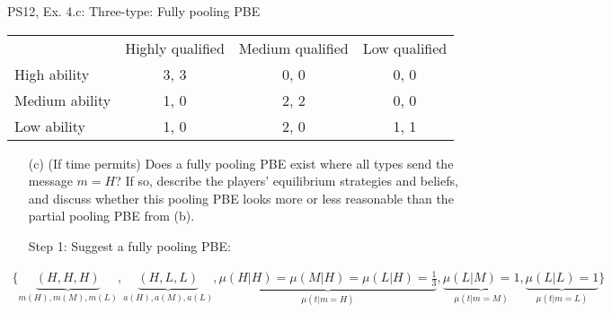 \begin{frame}{PS12, Ex. 4.c: Three-type: Fully pooling PBE}
    \begin{table}
      \begin{tabular}{l|c|c|c|}
          \multicolumn{1}{c}{} & \multicolumn{1}{c}{Highly qualified} & \multicolumn{1}{c}{Medium qualified} & \multicolumn{1}{c}{Low qualified} \\\cline{2-4}
          High ability   & 3, 3 & 0, 0 & 0, 0 \\\cline{2-4}
          Medium ability & 1, 0 & 2, 2 & 0, 0 \\\cline{2-4}
          Low ability    & 1, 0 & 2, 0 & 1, 1 \\\cline{2-4}
      \end{tabular}
    \end{table}\vspace{-8pt}
    \begin{itemize}
      \item[(c)] (If time permits) Does a fully pooling PBE exist where all types send the message $m = H$? If so, describe the players’ equilibrium strategies and beliefs, and discuss whether this pooling PBE looks more or less reasonable than the partial pooling PBE from (b).
      \item[Step 1:] Suggest a fully pooling PBE:
    \end{itemize}\vspace{-12pt}
    \begin{align*}
      \{\underbrace{(H,H,H)}_{m(H),m(M),m(L)},\underbrace{(H,L,L)}_{a(H),a(M),a(L)},\underbrace{\mu(H|H)=\mu(M|H)=\mu(L|H)=\frac{1}{3}}_{\mu(t|m=H)},\underbrace{\mu(L|M)=1}_{\mu(t|m=M)},\underbrace{\mu(L|L)=1}_{\mu(t|m=L)}\}
    \end{align*}
    \vfill\null
\end{frame}
